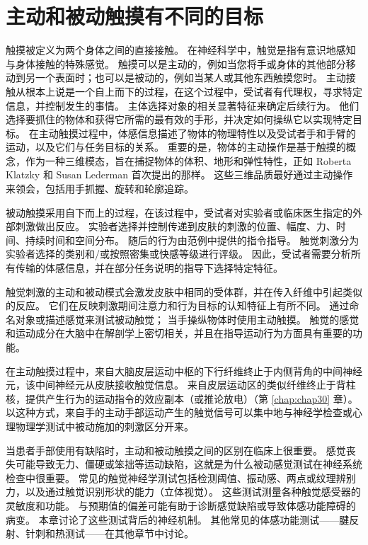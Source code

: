 \section{主动和被动触摸有不同的目标}
触摸被定义为两个身体之间的直接接触。 
在神经科学中，触觉是指有意识地感知与身体接触的特殊感觉。 
触摸可以是主动的，例如当您将手或身体的其他部分移动到另一个表面时；也可以是被动的，例如当某人或其他东西触摸您时。 
主动接触从根本上说是一个自上而下的过程，在这个过程中，受试者有代理权，寻求特定信息，并控制发生的事情。 
主体选择对象的相关显著特征来确定后续行为。 
他们选择要抓住的物体和获得它所需的最有效的手形，并决定如何操纵它以实现特定目标。 
在主动触摸过程中，体感信息描述了物体的物理特性以及受试者手和手臂的运动，以及它们与任务目标的关系。
重要的是，物体的主动操作是基于触摸的概念，作为一种三维模态，旨在捕捉物体的体积、地形和弹性特性，正如 Roberta Klatzky 和 Susan Lederman 首次提出的那样。 
这些三维品质最好通过主动操作来领会，包括用手抓握、旋转和轮廓追踪。


被动触摸采用自下而上的过程，在该过程中，受试者对实验者或临床医生指定的外部刺激做出反应。 
实验者选择并控制传递到皮肤的刺激的位置、幅度、力、时间、持续时间和空间分布。 
随后的行为由范例中提供的指令指导。 
触觉刺激分为实验者选择的类别和/或按照密集或快感等级进行评级。 
因此，受试者需要分析所有传输的体感信息，并在部分任务说明的指导下选择特定特征。


触觉刺激的主动和被动模式会激发皮肤中相同的受体群，并在传入纤维中引起类似的反应。 
它们在反映刺激期间注意力和行为目标的认知特征上有所不同。 
通过命名对象或描述感觉来测试被动触觉； 当手操纵物体时使用主动触摸。 
触觉的感觉和运动成分在大脑中在解剖学上密切相关，并且在指导运动行为方面具有重要的功能。


在主动触摸过程中，来自大脑皮层运动中枢的下行纤维终止于内侧背角的中间神经元，该中间神经元从皮肤接收触觉信息。 
来自皮层运动区的类似纤维终止于背柱核，提供产生行为的运动指令的效应副本（或推论放电）（第 \ref{chap:chap30} 章）。 
以这种方式，来自手的主动手部运动产生的触觉信号可以集中地与神经学检查或心理物理学测试中被动施加的刺激区分开来。


当患者手部使用有缺陷时，主动和被动触摸之间的区别在临床上很重要。
感觉丧失可能导致无力、僵硬或笨拙等运动缺陷，这就是为什么被动感觉测试在神经系统检查中很重要。
常见的触觉神经学测试包括检测阈值、振动感、两点或纹理辨别力，以及通过触觉识别形状的能力（立体视觉）。 
这些测试测量各种触觉感受器的灵敏度和功能。 
与预期值的偏差可能有助于诊断感觉缺陷或导致体感功能障碍的病变。 
本章讨论了这些测试背后的神经机制。 
其他常见的体感功能测试——腱反射、针刺和热测试——在其他章节中讨论。


